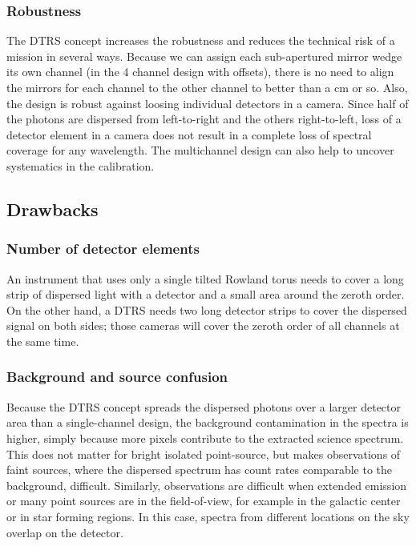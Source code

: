 \documentclass[linenumbers]{aastex631}
\begin{document}
\subsubsection{Robustness}
The DTRS concept increases the robustness and reduces the technical risk of a mission in several ways. Because we can assign each sub-apertured mirror wedge its own channel (in the 4 channel design with offsets), there is no need to align the mirrors for each channel to the other channel to better than a cm or so.
Also, the design is robust against loosing individual detectors in a camera. Since half of the photons are dispersed from left-to-right and the others right-to-left, loss of a detector element in a camera does not result in a complete loss of spectral coverage for any wavelength. The multichannel design can also help to uncover systematics in the calibration.




\subsection{Drawbacks}
\subsubsection{Number of detector elements}
An instrument that uses only a single tilted Rowland torus needs to cover a long strip of dispersed light with a detector and a small area around the zeroth order. On the other hand, a DTRS needs two long detector strips to cover the dispersed signal on both sides; those cameras will cover the zeroth order of all channels at the same time.

\subsubsection{Background and source confusion}
Because the DTRS concept spreads the dispersed photons over a larger detector area than a single-channel design, the background contamination in the spectra is higher, simply because more pixels contribute to the extracted science spectrum. This does not matter for bright isolated point-source, but makes observations of faint sources, where the dispersed spectrum has count rates comparable to the background, difficult. Similarly, observations are difficult when extended emission or many point sources are in the field-of-view, for example in the galactic center or in star forming regions. In this case, spectra from different locations on the sky overlap on the detector.
\end{document}
